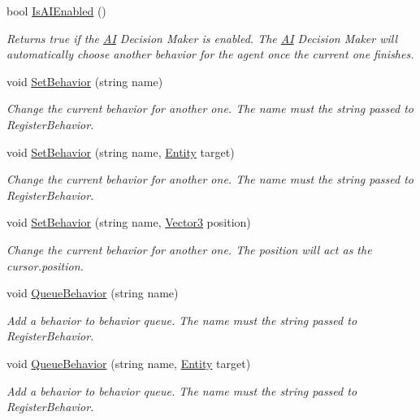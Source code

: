 \begin{DoxyCompactItemize}
bool \mbox{\hyperlink{class_lua_1_1_a_i_afbbbf8be061465aba93a7b1c73402ae4}{Is\+A\+I\+Enabled}} ()
\begin{DoxyCompactList}\small\item\em Returns true if the \mbox{\hyperlink{class_lua_1_1_a_i}{AI}} Decision Maker is enabled. The \mbox{\hyperlink{class_lua_1_1_a_i}{AI}} Decision Maker will automatically choose another behavior for the agent once the current one finishes. \end{DoxyCompactList}\item 
void \mbox{\hyperlink{class_lua_1_1_a_i_a2ab87c868530bf4f91fb44374cd58337}{Set\+Behavior}} (string name)
\begin{DoxyCompactList}\small\item\em Change the current behavior for another one. The name must the string passed to Register\+Behavior. \end{DoxyCompactList}\item 
void \mbox{\hyperlink{class_lua_1_1_a_i_a9555e89507ac0b07384beab7238dc419}{Set\+Behavior}} (string name, \mbox{\hyperlink{class_lua_1_1_entity}{Entity}} target)
\begin{DoxyCompactList}\small\item\em Change the current behavior for another one. The name must the string passed to Register\+Behavior. \end{DoxyCompactList}\item 
void \mbox{\hyperlink{class_lua_1_1_a_i_a7e50aee44b076aa5c37535dcc55b2c55}{Set\+Behavior}} (string name, \mbox{\hyperlink{class_lua_1_1_vector3}{Vector3}} position)
\begin{DoxyCompactList}\small\item\em Change the current behavior for another one. The position will act as the cursor.\+position. \end{DoxyCompactList}\item 
void \mbox{\hyperlink{class_lua_1_1_a_i_a60b9147746afd2cbbdf7e6ee5f7c6aff}{Queue\+Behavior}} (string name)
\begin{DoxyCompactList}\small\item\em Add a behavior to behavior queue. The name must the string passed to Register\+Behavior. \end{DoxyCompactList}\item 
void \mbox{\hyperlink{class_lua_1_1_a_i_af74652cc45af0d8a62bcd75caa595ea5}{Queue\+Behavior}} (string name, \mbox{\hyperlink{class_lua_1_1_entity}{Entity}} target)
\begin{DoxyCompactList}\small\item\em Add a behavior to behavior queue. The name must the string passed to Register\+Behavior. \end{DoxyCompactList}\item 

\end{DoxyCompactItemize}
